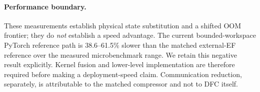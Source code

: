 \paragraph{Performance boundary.}
These measurements establish physical state substitution and a shifted OOM
frontier; they do \emph{not} establish a speed advantage.  The current
bounded-workspace PyTorch reference path is 38.6--61.5\% slower than the matched
external-EF reference over the measured microbenchmark range.  We retain this
negative result explicitly.  Kernel fusion and lower-level implementation are
therefore required before making a deployment-speed claim.  Communication
reduction, separately, is attributable to the matched compressor and not to
DFC itself.
